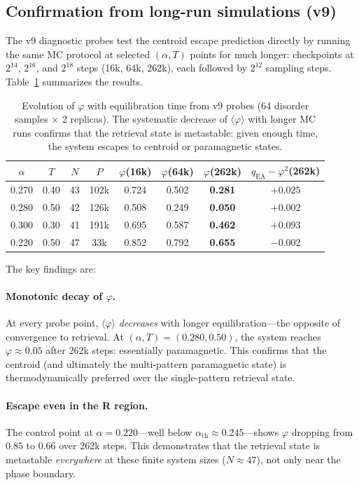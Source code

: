 \documentclass[11pt]{article}
\newcommand{\avg}[1]{\langle #1 \rangle}
\begin{document}
\subsection{Confirmation from long-run simulations (v9)}

The v9 diagnostic probes test the centroid escape prediction directly by running the same MC protocol at selected $(\alpha, T)$ points for much longer: checkpoints at $2^{14}$, $2^{16}$, and $2^{18}$ steps (16k, 64k, 262k), each followed by $2^{12}$ sampling steps.  Table~\ref{tab:v9} summarizes the results.

\begin{table}[h]
\centering
\caption{Evolution of $\varphi$ with equilibration time from v9 probes (64 disorder samples $\times$ 2 replicas).  The systematic decrease of $\avg{\varphi}$ with longer MC runs confirms that the retrieval state is metastable: given enough time, the system escapes to centroid or paramagnetic states.}
\label{tab:v9}
\begin{tabular}{cccccccc}
\toprule
$\alpha$ & $T$ & $N$ & $P$ & $\varphi$(16k) & $\varphi$(64k) & $\varphi$(262k) & $q_{\mathrm{EA}}\!-\!\varphi^2$(262k) \\
\midrule
0.270 & 0.40 & 43 & 102k & 0.724 & 0.502 & \textbf{0.281} & $+0.025$ \\
0.280 & 0.50 & 42 & 126k & 0.508 & 0.249 & \textbf{0.050} & $+0.002$ \\
0.300 & 0.30 & 41 & 191k & 0.695 & 0.587 & \textbf{0.462} & $+0.093$ \\
0.220 & 0.50 & 47 &  33k & 0.852 & 0.792 & \textbf{0.655} & $-0.002$ \\
\bottomrule
\end{tabular}
\end{table}

The key findings are:

\paragraph{Monotonic decay of $\varphi$.}  At every probe point, $\avg{\varphi}$ \emph{decreases} with longer equilibration---the opposite of convergence to retrieval.  At $(\alpha, T) = (0.280, 0.50)$, the system reaches $\varphi \approx 0.05$ after $262$k steps: essentially paramagnetic.  This confirms that the centroid (and ultimately the multi-pattern paramagnetic state) is thermodynamically preferred over the single-pattern retrieval state.

\paragraph{Escape even in the R region.}  The control point at $\alpha = 0.220$---well below $\alpha_{\mathrm{th}} \approx 0.245$---shows $\varphi$ dropping from $0.85$ to $0.66$ over $262$k steps.  This demonstrates that the retrieval state is metastable \emph{everywhere} at these finite system sizes ($N \approx 47$), not only near the phase boundary.
\end{document}
